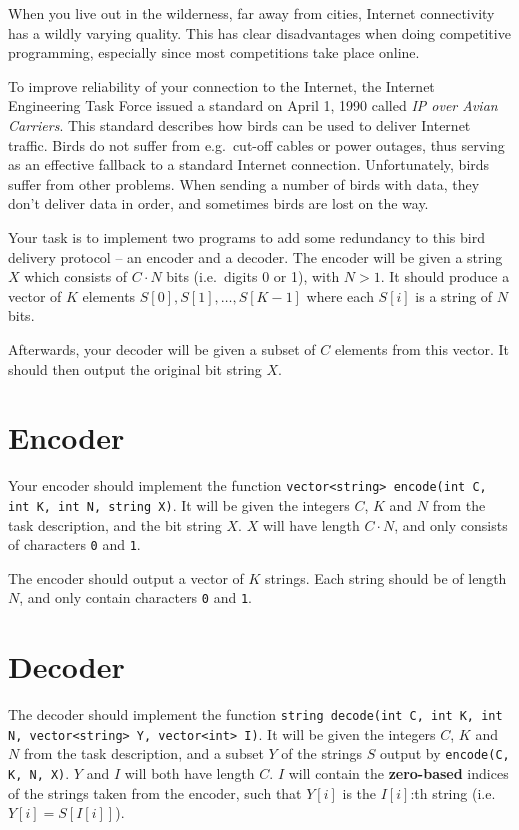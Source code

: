 \def\version{1}
When you live out in the wilderness, far away from cities, Internet connectivity has a wildly varying quality.
This has clear disadvantages when doing competitive programming, especially since most competitions take place online.

To improve reliability of your connection to the Internet, the Internet Engineering Task Force issued a standard on April 1, 1990 called \emph{IP over Avian Carriers}.
This standard describes how birds can be used to deliver Internet traffic.
Birds do not suffer from e.g.\ cut-off cables or power outages, thus serving as an effective fallback to a standard Internet connection.
Unfortunately, birds suffer from other problems.
When sending a number of birds with data, they don't deliver data in order, and sometimes birds are lost on the way.

Your task is to implement two programs to add some redundancy to this bird delivery protocol -- an encoder and a decoder.
The encoder will be given a string $X$ which consists of $C \cdot N$ bits (i.e.\ digits 0 or 1), with $N > 1$.
It should produce a vector of $K$ elements $S[0], S[1], \dots, S[K - 1]$ where each $S[i]$ is a string of $N$ bits.

Afterwards, your decoder will be given a subset of $C$ elements from this vector.
It should then output the original bit string $X$.

\section*{Encoder}
Your encoder should implement the function \texttt{vector<string> encode(int C, int K, int N, string X)}.
It will be given the integers $C$, $K$ and $N$ from the task description, and the bit string $X$.
$X$ will have length $C \cdot N$, and only consists of characters \texttt{0} and \texttt{1}.

The encoder should output a vector of $K$ strings.
Each string should be of length $N$, and only contain characters \texttt{0} and \texttt{1}.

\section*{Decoder}
The decoder should implement the function \texttt{string decode(int C, int K, int N, vector<string> Y, vector<int> I)}.
It will be given the integers $C$, $K$ and $N$ from the task description, and a subset $Y$ of the strings $S$ output by \texttt{encode(C, K, N, X)}.
$Y$ and $I$ will both have length $C$.
$I$ will contain the \textbf{zero-based} indices of the strings taken from the encoder, such that $Y[i]$ is the $I[i]$:th string (i.e. $Y[i] = S[I[i]]$).

